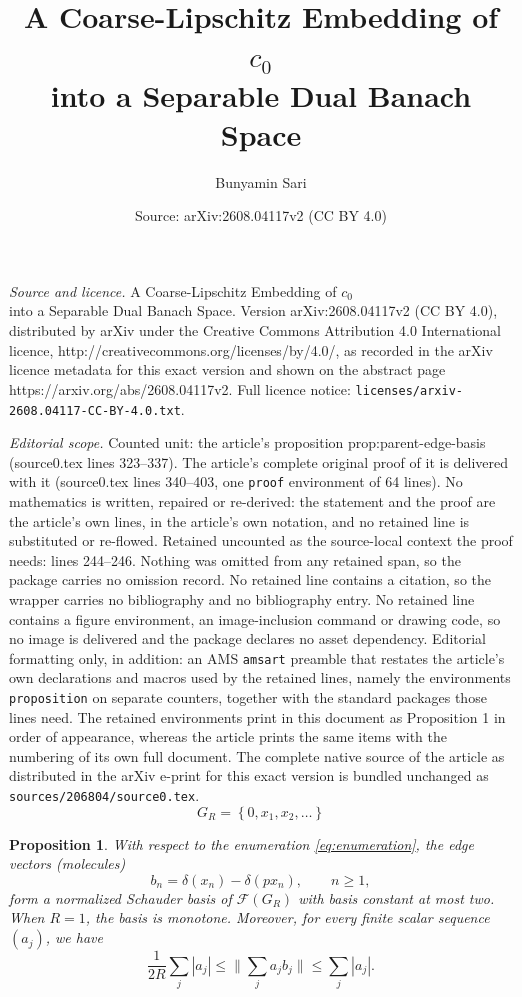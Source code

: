 \documentclass[10pt,a4paper]{amsart}
\title{A Coarse-Lipschitz Embedding of $c_0$\\ into a Separable Dual Banach Space}
\author{Bunyamin Sari}
\date{Source: arXiv:2608.04117v2 (CC BY 4.0)}
\newtheorem{proposition}{Proposition}
\newcommand{\F}{\mathcal F}
\newcommand{\abs}[1]{\left\lvert#1\right\rvert}
\newcommand{\set}[1]{\left\{#1\right\}}
\begin{document}
\maketitle

\noindent\emph{Source and licence.} A Coarse-Lipschitz Embedding of $c_0$\\ into a Separable Dual Banach Space. Version arXiv:2608.04117v2 (CC BY 4.0), distributed by arXiv under the Creative Commons Attribution 4.0 International licence, http://creativecommons.org/licenses/by/4.0/, as recorded in the arXiv licence metadata for this exact version and shown on the abstract page https://arxiv.org/abs/2608.04117v2. Full licence notice: \texttt{licenses/arxiv-2608.04117-CC-BY-4.0.txt}.\par\smallskip

\noindent\textit{Editorial scope.} Counted unit: the article's proposition prop:parent-edge-basis (source0.tex lines 323--337). The article's complete original proof of it is delivered with it (source0.tex lines 340--403, one \texttt{proof} environment of 64 lines). No mathematics is written, repaired or re-derived: the statement and the proof are the article's own lines, in the article's own notation, and no retained line is substituted or re-flowed.  Retained uncounted as the source-local context the proof needs: lines 244--246.  Nothing was omitted from any retained span, so the package carries no omission record.  No retained line contains a citation, so the wrapper carries no bibliography and no bibliography entry.  No retained line contains a figure environment, an image-inclusion command or drawing code, so no image is delivered and the package declares no asset dependency.  Editorial formatting only, in addition: an AMS \texttt{amsart} preamble that restates the article's own declarations and macros used by the retained lines, namely the environments \texttt{proposition} on separate counters, together with the standard packages those lines need.  The retained environments print in this document as Proposition 1 in order of appearance, whereas the article prints the same items with the numbering of its own full document.  The complete native source of the article as distributed in the arXiv e-print for this exact version is bundled unchanged as \texttt{sources/206804/source0.tex}.
\begin{equation}\label{eq:enumeration}
       G_R=\set{0,x_1,x_2,\ldots}
\end{equation}

\begin{proposition}\label{prop:parent-edge-basis}
With respect to the enumeration \eqref{eq:enumeration}, the edge vectors (molecules)
$$
b_n=\delta(x_n)-\delta(px_n),
\qquad n\geq1,
$$
form a normalized Schauder basis of $\F(G_R)$ with basis constant at most two.  When $R=1$,
the basis is monotone.  Moreover, for every finite scalar sequence
$(a_j)$, we have
\begin{equation}\label{eq:l1-equivalence}
\frac{1}{2R}\sum_j\abs{a_j}
\leq\Big\|\sum_j a_jb_j\Big\|
\leq\sum_j\abs{a_j}.
\end{equation}
\end{proposition}
\end{document}
